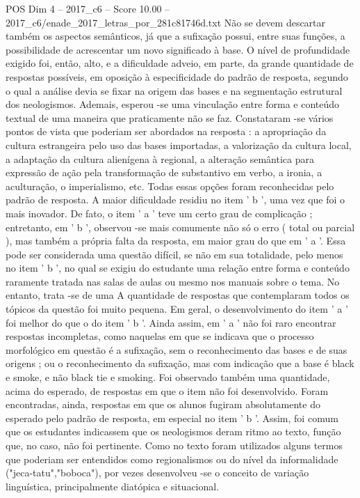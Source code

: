 \begin{textsample}{POS Dim 4 – 2017\_c6 – Score 10.00 – 2017\_c6/enade\_2017\_letras\_por\_281c81746d.txt}
Não se devem descartar também os aspectos semânticos, já que a sufixação possui, entre suas funções, a possibilidade de acrescentar um novo significado à base.
O nível de profundidade exigido foi, então, alto, e a dificuldade adveio, em parte, da grande quantidade de respostas possíveis, em oposição à especificidade do padrão de resposta, segundo o qual a análise devia se fixar na origem das bases e na segmentação estrutural dos neologismos.
Ademais, esperou -se uma vinculação entre forma e conteúdo textual de uma maneira que praticamente não se faz.
Constataram -se vários pontos de vista que poderiam ser abordados na resposta : a apropriação da cultura estrangeira pelo uso das bases importadas, a valorização da cultura local, a adaptação da cultura alienígena à regional, a alteração semântica para expressão de ação pela transformação de substantivo em verbo, a ironia, a aculturação, o imperialismo, etc.
Todas essas opções foram reconhecidas pelo padrão de resposta.
A maior dificuldade residiu no item ' b ', uma vez que foi o mais inovador.
De fato, o item ' a ' teve um certo grau de complicação ; entretanto, em ' b ', observou -se mais comumente não só o erro ( total ou parcial ), mas também a própria falta da resposta, em maior grau do que em ' a '.
Essa pode ser considerada uma questão difícil, se não em sua totalidade, pelo menos no item ' b ', no qual se exigiu do estudante uma relação entre forma e conteúdo raramente tratada nas salas de aulas ou mesmo nos manuais sobre o tema.
No entanto, trata -se de uma A quantidade de respostas que contemplaram todos os tópicos da questão foi muito pequena.
Em geral, o desenvolvimento do item ' a ' foi melhor do que o do item ' b '.
Ainda assim, em ' a ' não foi raro encontrar respostas incompletas, como naquelas em que se indicava que o processo morfológico em questão é a sufixação, sem o reconhecimento das bases e de suas origens ; ou o reconhecimento da sufixação, mas com indicação que a base é black e smoke, e não black tie e smoking.
Foi observado também uma quantidade, acima do esperado, de respostas em que o item não foi desenvolvido.
Foram encontradas, ainda, respostas em que os alunos fugiram absolutamente do esperado pelo padrão de resposta, em especial no item ' b '.
Assim, foi comum que os estudantes indicassem que os neologismos deram ritmo ao texto, função que, no caso, não foi pertinente.
Como no texto foram utilizados alguns termos que poderiam ser entendidos como regionalismos ou do nível da informalidade ("jeca-tatu","boboca"), por vezes desenvolveu -se o conceito de variação linguística, principalmente diatópica e situacional.

\end{textsample}
